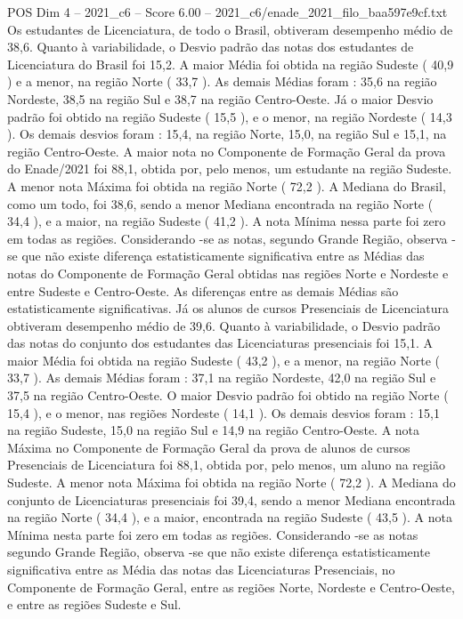 \begin{textsample}{POS Dim 4 – 2021\_c6 – Score 6.00 – 2021\_c6/enade\_2021\_filo\_baa597e9cf.txt}
Os estudantes de Licenciatura, de todo o Brasil, obtiveram desempenho médio de 38,6.
Quanto à variabilidade, o Desvio padrão das notas dos estudantes de Licenciatura do Brasil foi 15,2.
A maior Média foi obtida na região Sudeste ( 40,9 ) e a menor, na região Norte ( 33,7 ).
As demais Médias foram : 35,6 na região Nordeste, 38,5 na região Sul e 38,7 na região Centro-Oeste.
Já o maior Desvio padrão foi obtido na região Sudeste ( 15,5 ), e o menor, na região Nordeste ( 14,3 ).
Os demais desvios foram : 15,4, na região Norte, 15,0, na região Sul e 15,1, na região Centro-Oeste.
A maior nota no Componente de Formação Geral da prova do Enade/2021 foi 88,1, obtida por, pelo menos, um estudante na região Sudeste.
A menor nota Máxima foi obtida na região Norte ( 72,2 ).
A Mediana do Brasil, como um todo, foi 38,6, sendo a menor Mediana encontrada na região Norte ( 34,4 ), e a maior, na região Sudeste ( 41,2 ).
A nota Mínima nessa parte foi zero em todas as regiões.
Considerando -se as notas, segundo Grande Região, observa -se que não existe diferença estatisticamente significativa entre as Médias das notas do Componente de Formação Geral obtidas nas regiões Norte e Nordeste e entre Sudeste e Centro-Oeste.
As diferenças entre as demais Médias são estatisticamente significativas.
Já os alunos de cursos Presenciais de Licenciatura obtiveram desempenho médio de 39,6.
Quanto à variabilidade, o Desvio padrão das notas do conjunto dos estudantes das Licenciaturas presenciais foi 15,1.
A maior Média foi obtida na região Sudeste ( 43,2 ), e a menor, na região Norte ( 33,7 ).
As demais Médias foram : 37,1 na região Nordeste, 42,0 na região Sul e 37,5 na região Centro-Oeste.
O maior Desvio padrão foi obtido na região Norte ( 15,4 ), e o menor, nas regiões Nordeste ( 14,1 ).
Os demais desvios foram : 15,1 na região Sudeste, 15,0 na região Sul e 14,9 na região Centro-Oeste.
A nota Máxima no Componente de Formação Geral da prova de alunos de cursos Presenciais de Licenciatura foi 88,1, obtida por, pelo menos, um aluno na região Sudeste.
A menor nota Máxima foi obtida na região Norte ( 72,2 ).
A Mediana do conjunto de Licenciaturas presenciais foi 39,4, sendo a menor Mediana encontrada na região Norte ( 34,4 ), e a maior, encontrada na região Sudeste ( 43,5 ).
A nota Mínima nesta parte foi zero em todas as regiões.
Considerando -se as notas segundo Grande Região, observa -se que não existe diferença estatisticamente significativa entre as Média das notas das Licenciaturas Presenciais, no Componente de Formação Geral, entre as regiões Norte, Nordeste e Centro-Oeste, e entre as regiões Sudeste e Sul.

\end{textsample}
